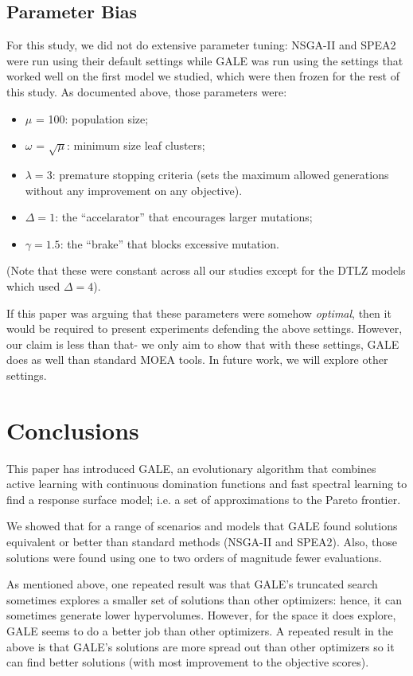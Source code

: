 \documentclass[10pt,journal,compsoc]{IEEEtran}
\newcommand{\bi}{\begin{itemize}}
\newcommand{\ei}{\end{itemize}}
\newenvironment{changed}{\par\color{MyDarkBlue}}{\par}
\begin{document}
\subsection{Parameter Bias}
For this study, we did not do extensive parameter tuning:
NSGA-II and SPEA2 were run using their default settings
while GALE was run using the settings that worked well on the first model we
studied, which were then frozen for the
rest of this study. As documented above, those parameters were:
\bi
\item $\mu$ = 100:  population size;
\item $\omega$ = $\sqrt{\mu}$: minimum size leaf clusters;
\item $\lambda = 3$: premature stopping criteria (sets the
maximum allowed 
generations without
any improvement on any objective).
\item   $\Delta=1$: the ``accelarator'' that encourages larger mutations;
\item  $\gamma=1.5$: the ``brake'' that blocks excessive mutation.
\ei
(Note that these were constant across all our studies except for the DTLZ models which used
$\Delta=4$).

If this paper was arguing that these parameters were somehow {\em optimal},
then it would be required to present experiments defending the above settings.
However, our  claim is less than that- we only aim  to show
that with these settings, GALE does as well than standard
MOEA tools. In future work, we will explore other  settings.



   
\section{Conclusions}
This paper has introduced GALE, an evolutionary
algorithm that combines active learning with
continuous domination functions and fast spectral
learning to find a response surface model; i.e. a
set of approximations to the Pareto frontier.


We showed that for a range of scenarios and models
that GALE found solutions equivalent or better than
standard methods (NSGA-II and SPEA2).  Also, those
solutions were found using one to two orders of
magnitude fewer evaluations.

\begin{changed}
As mentioned above, one repeated result was
that
GALE's truncated search sometimes explores a
smaller set of solutions than other
optimizers: hence, it can sometimes generate lower hypervolumes.
However, for the space it does explore,
GALE seems to do a better job than other optimizers.
A repeated result in the above is that GALE's solutions are more spread out
than other optimizers so 
 it 
can find better solutions (with most improvement to the objective scores).
\end{changed}
\end{document}
